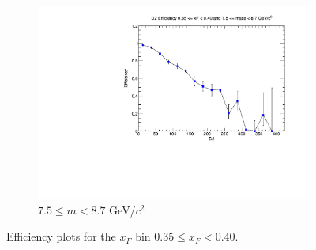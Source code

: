 \documentclass[11pt]{article}
\begin{document}
\begin{figure}[p]
\begin{subfigure}[b]{0.32\textwidth}
        \includegraphics[width=\textwidth]{./kTrackerEfficiencyPlots/D2_Efficiency_xF7_mass10.pdf}
        \caption{$7.5 \leq m < 8.7$ GeV/$c^2$}
    \end{subfigure}
    \caption{Efficiency plots for the $x_F$ bin $0.35 \leq x_F < 0.40$.}
\end{figure}
\end{document}
